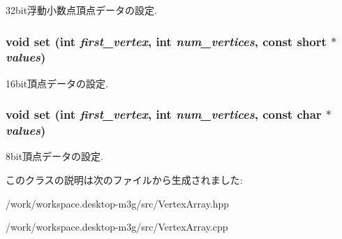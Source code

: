 32bit浮動小数点頂点データの設定. \hypertarget{classm3g_1_1VertexArray_f417744f1798d293c85c5e7fb6e1e846}{
\subsubsection[{set}]{\setlength{\rightskip}{0pt plus 5cm}void set (int {\em first\_\-vertex}, \/  int {\em num\_\-vertices}, \/  const short $\ast$ {\em values})}}
\label{classm3g_1_1VertexArray_f417744f1798d293c85c5e7fb6e1e846}


16bit頂点データの設定. \hypertarget{classm3g_1_1VertexArray_c92a86c7439c8e38c7e5b69e3eca3ee1}{
\subsubsection[{set}]{\setlength{\rightskip}{0pt plus 5cm}void set (int {\em first\_\-vertex}, \/  int {\em num\_\-vertices}, \/  const char $\ast$ {\em values})}}
\label{classm3g_1_1VertexArray_c92a86c7439c8e38c7e5b69e3eca3ee1}


8bit頂点データの設定. 

このクラスの説明は次のファイルから生成されました:\begin{CompactItemize}
\item 
/work/workspace.desktop-m3g/src/VertexArray.hpp\item 
/work/workspace.desktop-m3g/src/VertexArray.cpp\end{CompactItemize}
